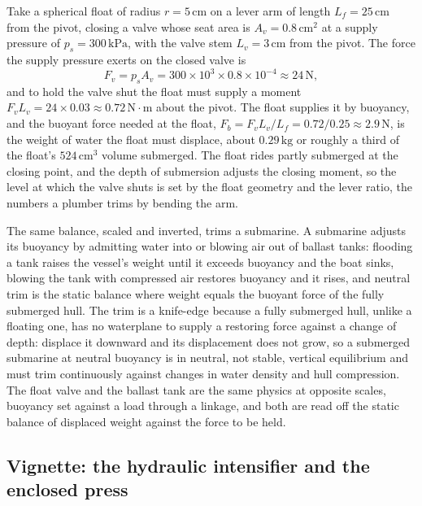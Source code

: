 Take a spherical float of radius $r = 5\,\si{\centi\meter}$ on a lever arm
of length $L_f = 25\,\si{\centi\meter}$ from the pivot, closing a valve
whose seat area is $A_v = 0.8\,\text{cm}^2$ at a supply pressure of $p_s =
300\,\text{kPa}$, with the valve stem $L_v = 3\,\si{\centi\meter}$ from the
pivot. The force the supply pressure exerts on the closed valve is
\[
F_v = p_s A_v = 300 \times 10^3 \times 0.8 \times 10^{-4}
\approx 24\,\text{N},
\]
and to hold the valve shut the float must supply a moment $F_v L_v = 24
\times 0.03 \approx 0.72\,\text{N}\cdot\text{m}$ about the pivot. The float
supplies it by buoyancy, and the buoyant force needed at the float,
$F_b = F_v L_v/L_f = 0.72/0.25 \approx 2.9\,\text{N}$, is the weight of
water the float must displace, about $0.29\,\si{\kilogram}$ or roughly a
third of the float's $524\,\text{cm}^3$ volume submerged. The float rides
partly submerged at the closing point, and the depth of submersion adjusts
the closing moment, so the level at which the valve shuts is set by the
float geometry and the lever ratio, the numbers a plumber trims by bending
the arm.

The same balance, scaled and inverted, trims a submarine. A submarine
adjusts its buoyancy by admitting water into or blowing air out of ballast
tanks: flooding a tank raises the vessel's weight until it exceeds
buoyancy and the boat sinks, blowing the tank with compressed air restores
buoyancy and it rises, and neutral trim is the static balance where weight
equals the buoyant force of the fully submerged hull. The trim is a
knife-edge because a fully submerged hull, unlike a floating one, has no
waterplane to supply a restoring force against a change of depth: displace
it downward and its displacement does not grow, so a submerged submarine at
neutral buoyancy is in neutral, not stable, vertical equilibrium and must
trim continuously against changes in water density and hull compression.
The float valve and the ballast tank are the same physics at opposite
scales, buoyancy set against a load through a linkage, and both are read
off the static balance of displaced weight against the force to be held.

\subsection{Vignette: the hydraulic intensifier and the enclosed press}

